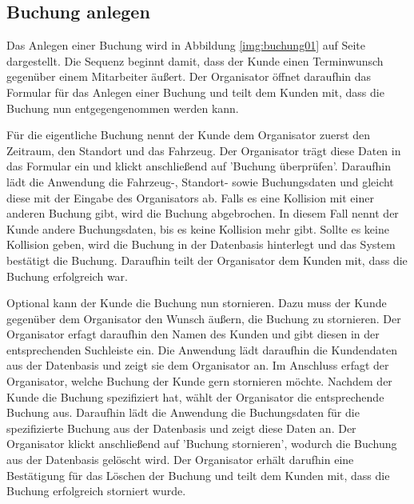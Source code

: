 \subsection{Buchung anlegen}


Das Anlegen einer Buchung wird in Abbildung \ref{img:buchung01} auf Seite \pageref{img:buchung01} dargestellt. Die Sequenz beginnt damit, dass der Kunde einen Terminwunsch gegenüber einem Mitarbeiter äußert. Der Organisator öffnet daraufhin das Formular für das Anlegen einer Buchung und teilt dem Kunden mit, dass die Buchung nun entgegengenommen werden kann.

Für die eigentliche Buchung nennt der Kunde dem Organisator zuerst den Zeitraum, den Standort und das Fahrzeug. Der Organisator trägt diese Daten in das Formular ein und klickt anschließend auf 'Buchung überprüfen'. Daraufhin lädt die Anwendung die Fahrzeug-, Standort- sowie Buchungsdaten und gleicht diese mit der Eingabe des Organisators ab. Falls es eine Kollision mit einer anderen Buchung gibt, wird die Buchung abgebrochen. In diesem Fall nennt der Kunde andere Buchungsdaten, bis es keine Kollision mehr gibt. Sollte es keine Kollision geben, wird die Buchung in der Datenbasis hinterlegt und das System bestätigt die Buchung. Daraufhin teilt der Organisator dem Kunden mit, dass die Buchung erfolgreich war.

Optional kann der Kunde die Buchung nun stornieren. Dazu muss der Kunde gegenüber dem Organisator den Wunsch äußern, die Buchung zu stornieren. Der Organisator erfagt daraufhin den Namen des Kunden und gibt diesen in der entsprechenden Suchleiste ein. Die Anwendung lädt daraufhin die Kundendaten aus der Datenbasis und zeigt sie dem Organisator an. Im Anschluss erfagt der Organisator, welche Buchung der Kunde gern stornieren möchte. Nachdem der Kunde die Buchung spezifiziert hat, wählt der Organisator die entsprechende Buchung aus. Daraufhin lädt die Anwendung die Buchungsdaten für die spezifizierte Buchung aus der Datenbasis und zeigt diese Daten an. Der Organisator klickt anschließend auf 'Buchung stornieren', wodurch die Buchung aus der Datenbasis gelöscht wird. Der Organisator erhält darufhin eine Bestätigung für das Löschen der Buchung und teilt dem Kunden mit, dass die Buchung erfolgreich storniert wurde. 

\newpage


